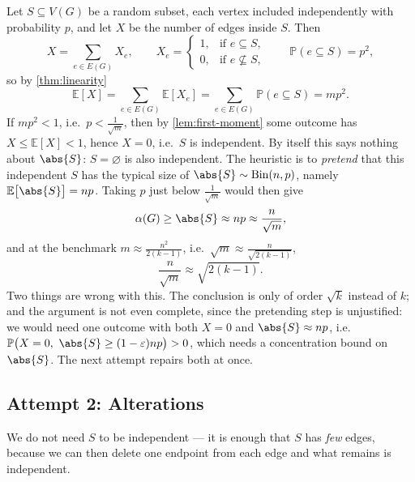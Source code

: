 Let \(S \subseteq V(G)\) be a random subset, each vertex included independently with probability \(p\), and let \(X\) be the number of edges inside \(S\). Then
\[
    X = \sum_{e \in E(G)} X_e, \qquad
    X_e = \begin{cases} 1, & \text{if } e \subseteq S, \\ 0, & \text{if } e \not\subseteq S, \end{cases}
    \qquad \mathbb{P}(e \subseteq S) = p^2,
\]
so by \autoref{thm:linearity}
\[
    \mathbb{E}[X] = \sum_{e \in E(G)} \mathbb{E}[X_e] = \sum_{e \in E(G)} \mathbb{P}(e \subseteq S) = m p^2.
\]
If \(mp^2 < 1\), i.e.\ \(p < \frac{1}{\sqrt{m}}\), then by \autoref{lem:first-moment} some outcome has \(X \le \mathbb{E}[X] < 1\), hence \(X = 0\), i.e.\ \(S\) is independent. By itself this says nothing about \(\abs{S}\): \(S = \varnothing\) is also independent. The heuristic is to \emph{pretend} that this independent \(S\) has the typical size of \(\abs{S} \sim \operatorname{Bin}(n,p)\), namely \(\mathbb{E}\bigl[ \abs{S} \bigr] = np\). Taking \(p\) just below \(\frac{1}{\sqrt{m}}\) would then give
\[
    \alpha(G) \ge \abs{S} \approx np \approx \frac{n}{\sqrt{m}},
\]
and at the benchmark \(m \approx \frac{n^2}{2(k-1)}\), i.e.\ \(\sqrt{m} \approx \frac{n}{\sqrt{2(k-1)}}\),
\[
    \frac{n}{\sqrt{m}} \approx \sqrt{2(k-1)}.
\]
Two things are wrong with this. The conclusion is only of order \(\sqrt{k}\) instead of \(k\); and the argument is not even complete, since the pretending step is unjustified: we would need one outcome with both \(X = 0\) and \(\abs{S} \approx np\), i.e.\ \(\mathbb{P}\bigl( X = 0, \ \abs{S} \ge (1-\varepsilon) np \bigr) > 0\), which needs a concentration bound on \(\abs{S}\). The next attempt repairs both at once.

\subsection{Attempt 2: Alterations}

We do not need \(S\) to be independent --- it is enough that \(S\) has \emph{few} edges, because we can then delete one endpoint from each edge and what remains is independent.

\begin{center}
\end{center}

